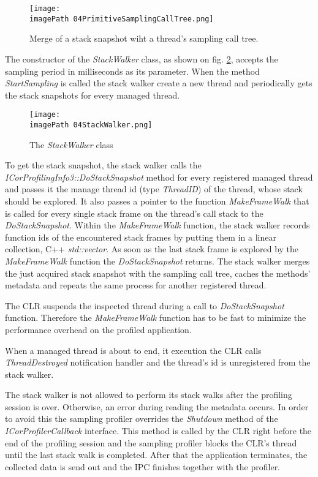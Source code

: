 \begin{figure}
	\centering
		\texttt{[image: \\imagePath 04PrimitiveSamplingCallTree.png]}
		\caption{ Merge of a stack snapshot wiht a thread's sampling call tree. }
	\label{fig:04PrimitiveSamplingCallTree}
\end{figure}

The constructor of the \textit{StackWalker} class, as shown on fig. \ref{fig:04StackWalker}, accepts the sampling period in milliseconds as its parameter. When the method \textit{StartSampling} is called the stack walker create a new thread and periodically gets the stack snapshots for every managed thread.

\begin{figure}
	\centering
		\texttt{[image: \\imagePath 04StackWalker.png]}
		\caption{ The \textit{StackWalker} class}
	\label{fig:04StackWalker}
\end{figure}


To get the stack snapshot, the stack walker calls the \textit{ICorProfilingInfo3::DoStackSnapshot} method for every registered managed thread and passes it the manage thread id (type \textit{ThreadID}) of the thread, whose stack should be explored. It also passes a pointer to the function \textit{MakeFrameWalk} that is called for every single stack frame on the thread's call stack to the \textit{DoStackSnapshot}. Within the \textit{MakeFrameWalk} function, the stack walker records function ids of the encountered stack frames by putting them in a linear collection, C++ \textit{std::vector}. As soon as the last stack frame is explored by the \textit{MakeFrameWalk} function the \textit{DoStackSnapshot} returns. The stack walker merges the just acquired stack snapshot with the sampling call tree, caches the methods' metadata and repeats the same process for another registered thread. 

The CLR suspends the inspected thread during a call to \textit{DoStackSnapshot} function. Therefore the \textit{MakeFrameWalk} function has to be fast to minimize the performance overhead on the profiled application.

When a managed thread is about to end, it execution the CLR calls \textit{ThreadDestroyed} notification handler and the thread's id is unregistered from the stack walker.

The stack walker is not allowed to perform its stack walks after the profiling session is over. Otherwise, an error during reading the metadata occurs. In order to avoid this the sampling profiler overrides the \textit{Shutdown} method of the \textit{ICorProfilerCallback} interface. This method is called by the CLR right before the end of the profiling session and the sampling profiler blocks the CLR's thread until the last stack walk is completed. After that the application terminates, the collected data is send out and the IPC finishes together with the profiler.

